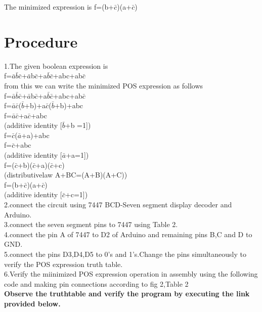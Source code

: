 \documentclass[journal,12pt,twocolumn]{IEEEtran}
\begin{document}
The minimized expression is f=(b+$\bar{c}$)(a+$\bar{c}$)


\section{\textbf{Procedure}}
1.The given boolean expression is 
\\f=$\bar{a}$$\bar{b}$$\bar{c}$+$\bar{a}$b$\bar{c}$+a$\bar{b}$$\bar{c}$+abc+ab$\bar{c}$\\from this we can write the minimized POS expression as follows\\
f=$\bar{a}$$\bar{b}$$\bar{c}$+$\bar{a}$b$\bar{c}$+a$\bar{b}$$\bar{c}$+abc+ab$\bar{c}$\\
f=$\bar{a}$$\bar{c}$($\bar{b}$+b)+a$\bar{c}$($\bar{b}$+b)+abc\\
f=$\bar{a}$$\bar{c}$+a$\bar{c}$+abc		\\(additive identity [$\bar{b}$+b =1])\\
f=$\bar{c}$($\bar{a}$+a)+abc\\
f=$\bar{c}$+abc \\(additive identity [$\bar{a}$+a=1])\\
f=($\bar{c}$+b)($\bar{c}$+a)($\bar{c}$+c)\\(distributivelaw A+BC=(A+B)(A+C))\\
f=(b+$\bar{c}$)(a+$\bar{c}$) \\(additive identity [$\bar{c}$+c=1])\\
2.connect the circuit using 7447 BCD-Seven segment display decoder and Arduino.\\
3.connect the seven segment pins to 7447 using Table 2.\\
4.connect the pin A of 7447 to D2 of Arduino and remaining pins B,C and D to GND.\\ 
5.connect the pins D3,D4,D5 to 0's and 1's.Change the pins simultaneously to verify the POS expression truth table.\\
6.Verify the miinimized POS expression operation in assembly using the following code and making pin connections according to fig 2,Table 2\\

\textbf{Observe the truthtable and verify the program by executing the link provided below.}\\
\begin{center}
\end{center}
\end{document}
